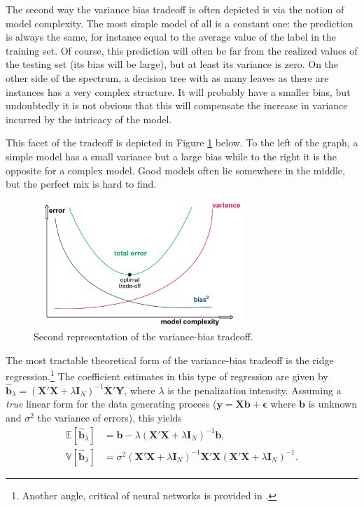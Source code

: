 \documentclass[]{krantz}
\let\rmarkdownfootnote\footnote%
\def\footnote{\protect\rmarkdownfootnote}
\theoremstyle{definition}
\theoremstyle{definition}
\theoremstyle{definition}
\theoremstyle{remark}
\begin{document}
The second way the variance bias tradeoff is often depicted is via the
notion of model complexity. The most simple model of all is a constant
one: the prediction is always the same, for instance equal to the
average value of the label in the training set. Of course, this
prediction will often be far from the realized values of the testing set
(its bias will be large), but at least its variance is zero. On the
other side of the spectrum, a decision tree with as many leaves as there
are instances has a very complex structure. It will probably have a
smaller bias, but undoubtedly it is not obvious that this will
compensate the increase in variance incurred by the intricacy of the
model.

This facet of the tradeoff is depicted in Figure \ref{fig:varbiastrade}
below. To the left of the graph, a simple model has a small variance but
a large bias while to the right it is the opposite for a complex model.
Good models often lie somewhere in the middle, but the perfect mix is
hard to find.

\begin{figure}[H]

{\centering \includegraphics[width=300px]{images/var_bias_trade2} 

}

\caption{Second representation of the variance-bias tradeoff.}\label{fig:varbiastrade}
\end{figure}

The most tractable theoretical form of the variance-bias tradeoff is the
ridge regression.\footnote{Another angle, critical of neural networks is
  provided in \citet{geman1992neural}.} The coefficient estimates in
this type of regression are given by
\(\hat{\mathbf{b}}_\lambda=(\mathbf{X}'\mathbf{X}+\lambda \mathbf{I}_N)^{-1}\mathbf{X}'\mathbf{Y}\),
where \(\lambda\) is the penalization intensity. Assuming a \emph{true}
linear form for the data generating process
(\(\textbf{y}=\textbf{Xb}+\boldsymbol{\epsilon}\) where \(\textbf{b}\)
is unknown and \(\sigma^2\) the variance of errors), this yields
\begin{align}   \label{eq:biastrade}
\mathbb{E}[\hat{\textbf{b}}_\lambda]&=\textbf{b}-\lambda(\textbf{X}'\textbf{X}+\lambda \textbf{I}_N)^{-1} \textbf{b}, \\  \label{eq:vartrade}
\mathbb{V}[\hat{\textbf{b}}_\lambda]&=\sigma^2(\textbf{X}'\textbf{X}+\lambda \textbf{I}_N)^{-1}\textbf{X}'\textbf{X}   (\textbf{X}'\textbf{X}+\lambda \textbf{I}_N)^{-1}.
\end{align}
\end{document}
